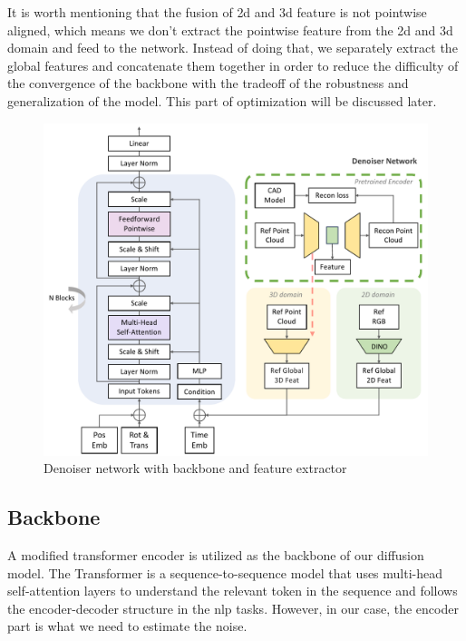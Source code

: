 \documentclass[12pt,DIV14,BCOR12mm,a4paper,footinclude=false,headinclude,parskip=half-,twoside,openright,cleardoublepage=empty,toc=index,bibliography=totoc,listof=totoc]{scrreprt}
\numberwithin{equation}{chapter}
\begin{document}
It is worth mentioning that the fusion of \gls{2d} and \gls{3d} feature is not pointwise aligned, which means we don't extract the pointwise feature from the \gls{2d} and \gls{3d} domain and feed to the network. Instead of doing that, we separately extract the global features and concatenate them together in order to reduce the difficulty of the convergence of the backbone with the tradeoff of the robustness and generalization of the model. This part of optimization will be discussed later.
\begin{figure}[h]
	\centering
	\includegraphics[width=1.0\textwidth]{img/denoiser.pdf}
	\caption{Denoiser network with backbone and feature extractor}
	\label{img:denoiser}
\end{figure}

\subsection{Backbone}
A modified transformer encoder is utilized as the backbone of our diffusion model. The Transformer \cite{vaswani2023attention} is a sequence-to-sequence model that uses multi-head self-attention layers to understand the relevant token in the sequence and follows the encoder-decoder structure in the \gls{nlp} tasks. However, in our case, the encoder part is what we need to estimate the noise.
\end{document}
